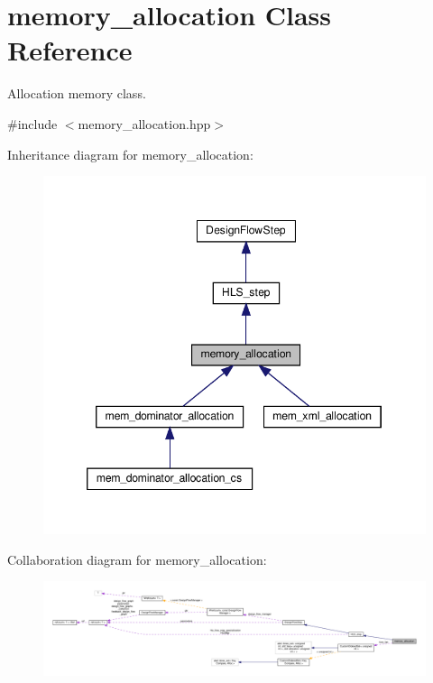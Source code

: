 \hypertarget{classmemory__allocation}{}\section{memory\+\_\+allocation Class Reference}
\label{classmemory__allocation}


Allocation memory class.  




{\ttfamily \#include $<$memory\+\_\+allocation.\+hpp$>$}



Inheritance diagram for memory\+\_\+allocation\+:
\nopagebreak
\begin{figure}[H]
\begin{center}
\leavevmode
\includegraphics[width=346pt]{d4/d19/classmemory__allocation__inherit__graph}
\end{center}
\end{figure}


Collaboration diagram for memory\+\_\+allocation\+:
\nopagebreak
\begin{figure}[H]
\begin{center}
\leavevmode
\includegraphics[width=350pt]{d3/d0c/classmemory__allocation__coll__graph}
\end{center}
\end{figure}
